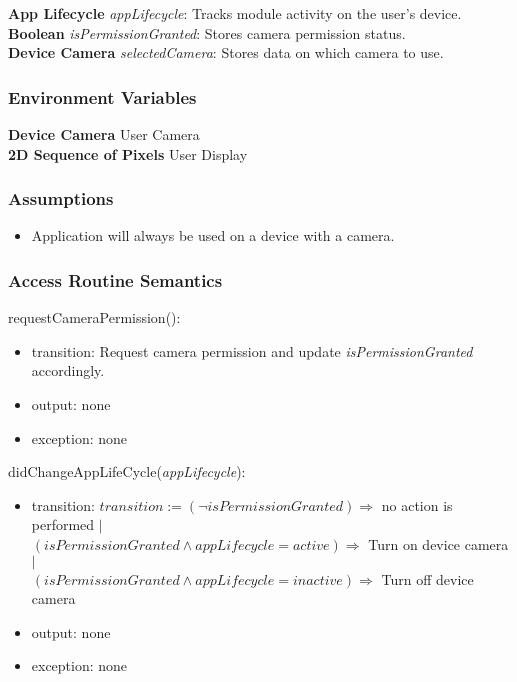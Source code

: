 \documentclass[12pt, titlepage]{article}
\begin{document}
\textbf{App Lifecycle} \textit{appLifecycle}: Tracks module activity on the user's device. \\
\textbf{Boolean} \textit{isPermissionGranted}: Stores camera permission status. \\
\textbf{Device Camera} \textit{selectedCamera}: Stores data on which camera to use.

\subsubsection{Environment Variables}

\textbf{Device Camera} User Camera \\
\textbf{2D Sequence of Pixels} User Display

\subsubsection{Assumptions}

\begin{itemize}
  \item Application will always be used on a device with a camera.
\end{itemize}

\subsubsection{Access Routine Semantics}

\noindent requestCameraPermission():
\begin{itemize}
  \item transition: Request camera permission and update \textit{isPermissionGranted} accordingly.
  \item output: none
  \item exception: none
  \end{itemize}

\noindent didChangeAppLifeCycle(\textit{appLifecycle}):
\begin{itemize}
  \item transition: $transition := (\neg isPermissionGranted) \Rightarrow$ no action is performed $|$\\
                    $(isPermissionGranted \land appLifecycle = active) \Rightarrow$ Turn on device camera $|$\\
                    $(isPermissionGranted \land appLifecycle = inactive) \Rightarrow$ Turn off device camera
  \item output: none
  \item exception: none
\end{itemize}
\end{document}
